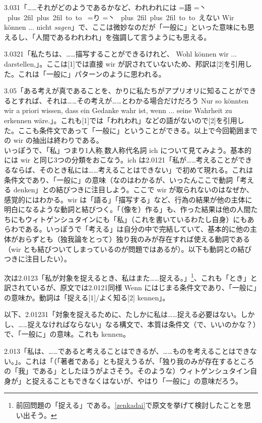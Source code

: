 \documentclass[11pt,a4paper]{jsarticle}
\newcommand{\ruby}[2]{%
    \leavevmode
    \setbox0=\hbox{#1}%
    \setbox1=\hbox{\tiny #2}%
    \ifdim\wd0>\wd1 \dimen0=\wd0 \else \dimen0=\wd1 \fi
    \hbox{%
    \kanjiskip=0pt plus 2fil
    \xkanjiskip=0pt plus 2fil
    \vbox{%
    \hbox to \dimen0{%
    \tiny \hfil#2\hfil}%
    \nointerlineskip
    \hbox to \dimen0{\mathstrut\hfil#1\hfil}}}}
\begin{document}
{3.031「……それがどのようであるかなど、われわれには\ruby{語}{丶}\ruby{り}{丶}えない Wir k\"onnen ... nicht {\it sagen}」で、ここは微妙なのだが「一般に」といった意味にも思えるし、「人間であるわれわれ」を強調して言うようにも思える。%

3.0321「私たちは、……描写することができるけれど、 Wohl k\"onnen wir ... darstellen,」。ここは[1]では直接 wir が訳されていないため、邦訳は[2]を引用した。これは「一般に」パターンのように思われる。

3.05「ある考えが真であることを、かりに私たちがアプリオリに知ることができるとすれば、それは……その考えが……とわかる場合だけだろう Nur so k\"onnten wir a priori wissen, dass ein Gedanke wahr ist, wenn ... seine Wahrheit zu erkennen w\"are.」。これも[1]では「われわれ」などの語がないので[2]を引用した。ここも条件文であって「一般に」ということができる。以上で今回範囲までの \frq{} wir \flq の抽出は終わりである。\\


いっぽうで、「私」つまり1人称{\b 単数}人称代名詞 \frq{} ich \flq について見てみよう。基本的には wir と同じ3つの分類をおこなう。ich は2.0121「私が……考えることができるならば、そのとき私には……考えることはできない」で初めて現れる。これは条件文であり、「一般に」の意味（なのはわかるが、いったんここで動詞「考える denken」との結びつきに注目しよう。ここで wir が取られないのはなぜか、感覚的にはわかる。wir は「語る」「描写する」など、行為の結果が他の主体に明白になるような動詞と結びつく。「（像を）作る」も、作った結果は他の人間たちにもウィトゲンシュタインにも「私」（これを書いているわたし自身）にもあらわである。いっぽうで「考える」は自分の中で完結していて、基本的に他の主体がおらずとも（独我論をとって）独り我のみが存在すれば使える動詞である（wir とも結びついてしまっているのが問題ではあるが）。以下も動詞との結びつきに注目したい）。

次は2.0123「私が対象を捉えるとき、私はまた……捉える。」\footnote{前回問題の「捉える」である。\ref{zenkadai}で原文を挙げて検討したことを思い出そう。}、これも「とき」と訳されているが、原文では2.0121同様 Wenn にはじまる条件文であり、「一般に」の意味か。動詞は「捉える[1]/よく知る[2] kennen」。

以下、2.01231「対象を捉えるために、たしかに私は……捉える必要はない。しかし、……捉えなければならない」なる構文で、本質は条件文（で、いいのかな？）で、「一般に」の意味。これも kennen。

2.013「私は、……であると考えることはできるが、……ものを考えることはできない。」。これは「（「著者である」とも捉えうるが、「独り我のみが存在するところの「我」である」としたほうがよさそう。そのような）ウィトゲンシュタイン自身が」と捉えることもできなくはないが、やはり「一般に」の意味だろう。

}
\end{document}
